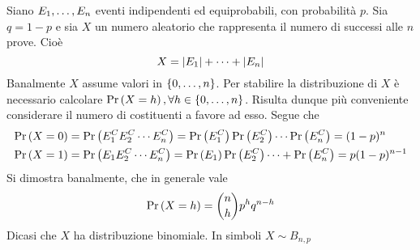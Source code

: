 \documentclass{subfiles}
\begin{document}
Siano \(\List{E}{1}{n}\) eventi indipendenti ed equiprobabili, con probabilità \(p\).
Sia \(q = 1 - p\) e sia \(X\) un numero aleatorio che rappresenta il numero di successi alle \(n\) prove.
Cioè
\[
    X = \left\vert {E_{1}} \right\vert + \cdots + \left\vert {E_{n}} \right\vert
\]
Banalmente \(X\) assume valori in \(\Set{0, \ldots, n}\).
Per stabilire la distribuzione di \(X\) è necessario calcolare \(\Prob{X = h}, \forall h \in \Set{0, \ldots, n}\).
Risulta dunque più conveniente considerare il numero di costituenti a favore ad esso.
Segue che
\[\begin{aligned}
        \Prob{X = 0} & = \Prob{E_{1}^{C}E_{2}^{C}\cdots E_{n}^{C}} = \Prob{E^{C}_{1}} \Prob{E^{C}_{2}} \cdots  \Prob{E^{C}_{n}} = (1 - p)^{n} \\
        \Prob{X = 1} & = \Prob{E_{1}E_{2}^{C}\cdots E_{n}^{C}} = \Prob{E_{1}} \Prob{E^{C}_{2}} \cdots + \Prob{E^{C}_{n}} = p(1 - p)^{n - 1}       \\
    \end{aligned}\]
Si dimostra banalmente, che in generale vale
\[
    \Prob{X = h} = \binom{n}{h}p^{h}q^{n - h}
\]
Dicasi che \(X\) ha distribuzione binomiale. In simboli \(X \sim B_{n,p}\)
\end{document}
